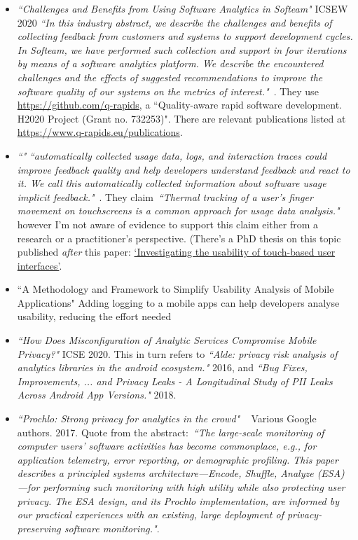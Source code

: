 \begin{itemize}
    \item \emph{``Challenges and Benefits from Using Software Analytics in Softeam"} ICSEW 2020 \emph{``In this industry abstract, we describe the challenges and benefits of collecting feedback from customers and systems to support development cycles. In Softeam, we have performed such collection and support in four iterations by means of a software analytics platform. We describe the encountered challenges and the effects of suggested recommendations to improve the software quality of our systems on the metrics of interest."}~\cite{bagnato2020_challenges_and_benefits_from_using_software_analytics_in_softeam}. They use \url{https://github.com/q-rapids}, a ``Quality-aware rapid software development. H2020 Project (Grant no. 732253)". There are relevant publications listed at \url{https://www.q-rapids.eu/publications}.
    \item \emph{``"} \emph{``automatically collected usage data, logs, and interaction traces could improve feedback quality and help developers understand feedback and react to it. We call this automatically collected information about software usage implicit feedback."}~\citep{maalej2016_towards_data_driven_requirements_engineering}. They claim~\emph{``Thermal tracking of a user’s finger movement on touchscreens is a common approach for usage data analysis."} however I'm not aware of evidence to support this claim either from a research or a practitioner's perspective. (There's a PhD thesis on this topic published \emph{after} this paper: \href{http://usir.salford.ac.uk/id/eprint/37784/}{`Investigating the usability of touch-based user interfaces'}.
    
    \item ``A Methodology and Framework to Simplify Usability Analysis of Mobile Applications" Adding logging to a mobile apps can help developers analyse usability, reducing the effort needed
    
    \item \emph{``How Does Misconfiguration of Analytic Services Compromise Mobile Privacy?"} ICSE 2020. This in turn refers to \emph{``Alde: privacy risk analysis of analytics libraries in the android ecosystem."} 2016, and \emph{``Bug Fixes, Improvements, ... and Privacy Leaks - A Longitudinal Study of PII Leaks Across Android App Versions."} 2018.
    
    \item \emph{``Prochlo: Strong privacy for analytics in the crowd"}  ~\citep{prochlo2017_strong_privacy_analytics_in_the_crowd_46411} Various Google authors. 2017. Quote from the abstract:~\emph{``The large-scale monitoring of computer users' software activities has become commonplace, e.g., for application telemetry, error reporting, or demographic profiling. This paper describes a principled systems architecture---Encode, Shuffle, Analyze (ESA)---for performing such monitoring with high utility while also protecting user privacy. The ESA design, and its Prochlo implementation, are informed by our practical experiences with an existing, large deployment of privacy-preserving software monitoring."}.


\end{itemize}
